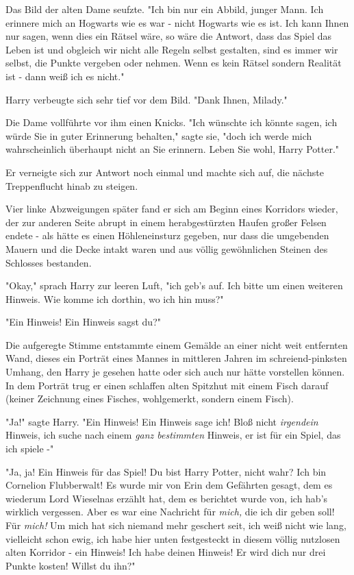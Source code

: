 {Das Bild der alten Dame seufzte. "Ich bin nur ein Abbild, junger Mann. Ich erinnere mich an Hogwarts wie es war - nicht Hogwarts wie es ist. Ich kann Ihnen nur sagen, wenn dies ein Rätsel wäre, so wäre die Antwort, dass das Spiel das Leben ist und obgleich wir nicht alle Regeln selbst gestalten, sind es immer wir selbst, die Punkte vergeben oder nehmen. Wenn es kein Rätsel sondern Realität ist - dann weiß ich es nicht."

Harry verbeugte sich sehr tief vor dem Bild. "Dank Ihnen, Milady."

Die Dame vollführte vor ihm einen Knicks. "Ich wünschte ich könnte sagen, ich würde Sie in guter Erinnerung behalten," sagte sie, "doch ich werde mich wahrscheinlich überhaupt nicht an Sie erinnern. Leben Sie wohl, Harry Potter."

Er verneigte sich zur Antwort noch einmal und machte sich auf, die nächste Treppenflucht hinab zu steigen.

Vier linke Abzweigungen später fand er sich am Beginn eines Korridors wieder, der zur anderen Seite abrupt in einem herabgestürzten Haufen großer Felsen endete - als hätte es einen Höhleneinsturz gegeben, nur dass die umgebenden Mauern und die Decke intakt waren und aus völlig gewöhnlichen Steinen des Schlosses bestanden.

"Okay," sprach Harry zur leeren Luft, "ich geb's auf. Ich bitte um einen weiteren Hinweis. Wie komme ich dorthin, wo ich hin muss?"

"Ein Hinweis! Ein Hinweis sagst du?"

Die aufgeregte Stimme entstammte einem Gemälde an einer nicht weit entfernten Wand, dieses ein Porträt eines Mannes in mittleren Jahren im schreiend-pinksten Umhang, den Harry je gesehen hatte oder sich auch nur hätte vorstellen können. In dem Porträt trug er einen schlaffen alten Spitzhut mit einem Fisch darauf (keiner Zeichnung eines Fisches, wohlgemerkt, sondern einem Fisch).

"Ja!" sagte Harry. "Ein Hinweis! Ein Hinweis sage ich! Bloß nicht \emph{irgendein} Hinweis, ich suche nach einem \emph{ganz bestimmten} Hinweis, er ist für ein Spiel, das ich spiele -"

"Ja, ja! Ein Hinweis für das Spiel! Du bist Harry Potter, nicht wahr? Ich bin Cornelion Flubberwalt! Es wurde mir von Erin dem Gefährten gesagt, dem es wiederum Lord Wieselnas erzählt hat, dem es berichtet wurde von, ich hab's wirklich vergessen. Aber es war eine Nachricht für \emph{mich,} die ich dir geben soll! Für \emph{mich!} Um mich hat sich niemand mehr geschert seit, ich weiß nicht wie lang, vielleicht schon ewig, ich habe hier unten festgesteckt in diesem völlig nutzlosen alten Korridor - ein Hinweis! Ich habe deinen Hinweis! Er wird dich nur drei Punkte kosten! Willst du ihn?"

}
